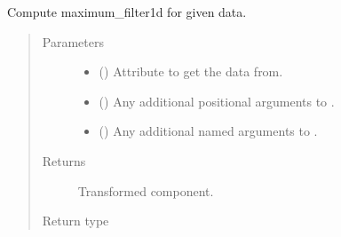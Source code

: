 \documentclass[letterpaper,10pt,english]{sphinxmanual}
\begin{document}
\begin{fulllineitems}
\begin{fulllineitems}
\label{\detokenize{api/base_classes:geology.src.base_spatial.SpatialComponent.maximum_filter1d}}
Compute maximum\_filter1d for given data.
\begin{quote}\begin{description}
\item[{Parameters}] \leavevmode\begin{itemize}
\item {} 
 (\sphinxstyleliteralemphasis{\sphinxupquote{, }}) \textendash{} Attribute to get the data from.

\item {} 
 () \textendash{} Any additional positional arguments to .

\item {} 
 () \textendash{} Any additional named arguments to .

\end{itemize}

\item[{Returns}] \leavevmode
{} \textendash{} Transformed component.

\item[{Return type}] \leavevmode
{\hyperref[\detokenize{api/base_classes:geology.src.base_spatial.SpatialComponent}]{}}

\end{description}\end{quote}

\end{fulllineitems}



\end{fulllineitems}
\end{document}
